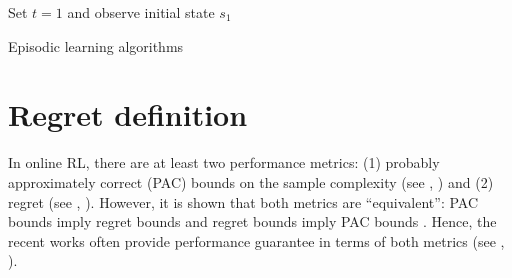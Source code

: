 \begin{algorithm}[ht]
    \DontPrintSemicolon
    \BlankLine
    Set $t=1$ and observe initial state $s_1$ \;
    \caption{Episodic learning algorithms}
    \label{ch:rl:algo:generics}
\end{algorithm}



%

\section{Regret definition}

In online RL, there are at least two performance metrics: (1) probably approximately correct (PAC) bounds on the sample complexity (see \eg, \cite{brafman2002r, kearns2002near, kakade2003sample, dann2015sample, jiang2018open, wang2020long}) and (2) regret (see \eg, \cite{jaksch2010near, osband2013more, azar2017minimax, jin2018q, zanette2019tighter, zhang2019regret}).
However, it is shown that both metrics are ``equivalent'': PAC bounds imply regret bounds and regret bounds imply PAC bounds \cite[Section~2.2.2]{osband2016deep}.
Hence, the recent works often provide performance guarantee in terms of both metrics (see \eg, \cite{he2021nearly, zhang2021reinforcement}).

